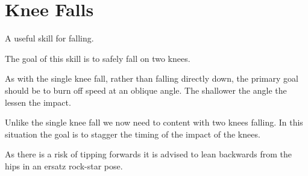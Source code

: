 \section{Knee Falls}
\label{sec:falls/double_knee}

A useful skill for falling.

The goal of this skill is to safely fall on two knees. 

As with the single knee fall, rather than falling directly down, the primary goal should be to burn off speed at an oblique angle. 
The shallower the angle the lessen the impact. 

Unlike the single knee fall we now need to content with two knees falling.
In this situation the goal is to stagger the timing of the impact of the knees. 

As there is a risk of tipping forwards it is advised to lean backwards from the hips in an ersatz rock-star pose. 


